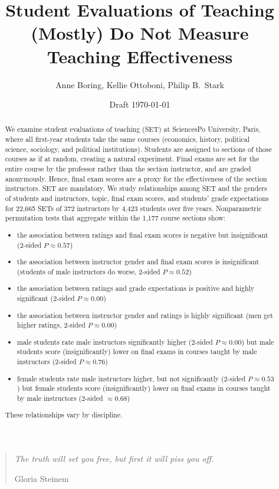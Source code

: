 \documentclass[12pt]{article}
\title{Student Evaluations of Teaching (Mostly) Do Not Measure Teaching Effectiveness}
\author{Anne Boring, Kellie Ottoboni, Philip B.~Stark}
\date{Draft \today}
\begin{document}
\maketitle

\newpage
\begin{quotation}
    \emph{The truth will set you free, but first it will piss you off.}
    
     \hfill Gloria Steinem

\begin{abstract}
We examine student evaluations of teaching (SET) at SciencesPo
University, Paris, where all
first-year students take the same courses 
(economics, history, political science, sociology, and political institutions). 
Students are assigned to sections of those courses as if at random, creating a natural experiment.
Final exams are set for the entire course
by the professor rather than the section instructor, and are graded anonymously.
Hence, final exam scores are a proxy for the effectiveness of the section instructors.
SET are mandatory.
We study relationships among SET and the genders of students and
instructors, topic, final exam scores, and students' grade expectations
for 22,665 SETs of 372 instructors by 4,423 students over five years.
Nonparametric permutation tests that aggregate within the 1,177 course sections show: 
\begin{itemize}
   \item the association between ratings and final 
            exam scores is negative but insignificant
            (2-sided $P \approx 0.57$)
   \item the association between instructor gender 
            and final exam scores is insignificant
            (students of male instructors do worse, 2-sided $P \approx 0.52$)
   \item the association between ratings and grade 
            expectations is positive and highly significant
            (2-sided $P \approx 0.00$)
   \item the association between instructor 
            gender and ratings is highly significant 
            (men get higher ratings, 2-sided $P \approx 0.00$)
   \item male students rate male instructors significantly higher (2-sided $P \approx 0.00$) 
            but male students score (insignificantly) lower on final exams in courses taught
            by male instructors (2-sided $P \approx 0.76$)
   \item female students rate male instructors higher, but not significantly (2-sided $P \approx 0.53$)
            but female students score (insignificantly) lower on final exams in courses taught
            by male instructors (2-sided $\approx 0.68$)
\end{itemize}
These relationships vary by discipline.

\end{abstract}

\newpage

\end{quotation}
\end{document}
